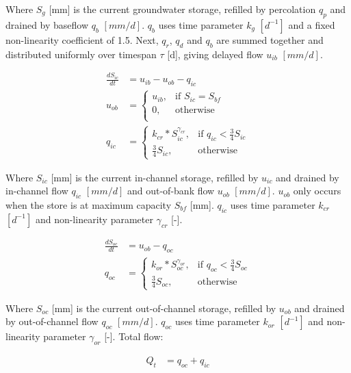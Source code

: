Where $S_g$ [mm] is the current groundwater storage, refilled by percolation $q_p$ and drained by baseflow $q_b$ $[mm/d]$.
$q_b$ uses time parameter $k_g$ $[d^{-1}]$ and a fixed non-linearity coefficient of 1.5. 
Next, $q_r$, $q_d$ and $q_b$ are summed together and distributed uniformly over timespan $\tau$ [d], giving delayed flow $u_{ib}$ $[mm/d]$.

\begin{align}
	\frac{dS_{ic}}{dt} &= u_{ib} - u_{ob} - q_{ic}\\
	u_{ob} &= \begin{cases}
		u_{ib}, & \text{if } S_{ic}=S_{bf} \\
		0, & \text{otherwise}\\
	\end{cases}\\
	q_{ic} &= \begin{cases}
		k_{cr}*S_{ic}^{\gamma_{cr}}, & \text{if } q_{ic}<\frac{3}{4}S_{ic} \\
		\frac{3}{4}S_{ic}, & \text{otherwise}
	\end{cases}
\end{align}

Where $S_{ic}$ [mm] is the current in-channel storage, refilled by $u_{ic}$ and drained by in-channel flow $q_{ic}$  $[mm/d]$ and out-of-bank flow $u_{ob}$  $[mm/d]$.
$u_{ob}$ only occurs when the store is at maximum capacity $S_{bf}$ [mm].
$q_{ic}$ uses time parameter $k_{cr}$ $[d^{-1}]$ and non-linearity parameter $\gamma_{cr}$ [-].

\begin{align}
	\frac{dS_{oc}}{dt} &= u_{ob} - q_{oc} \\
	q_{oc} &= \begin{cases}
		k_{or}*S_{oc}^{\gamma_{or}}, & \text{if } q_{oc}<\frac{3}{4}S_{oc} \\
		\frac{3}{4}S_{oc}, & \text{otherwise}
	\end{cases} 
\end{align}

Where $S_{oc}$ [mm] is the current out-of-channel storage, refilled by $u_{ob}$ and drained by out-of-channel flow $q_{oc}$  $[mm/d]$.
$q_{oc}$  uses time parameter $k_{or}$ $[d^{-1}]$ and non-linearity parameter $\gamma_{or}$ [-]. Total flow:

\begin{align}
	Q_t &= q_{oc}+q_{ic}
\end{align}

\newpage
